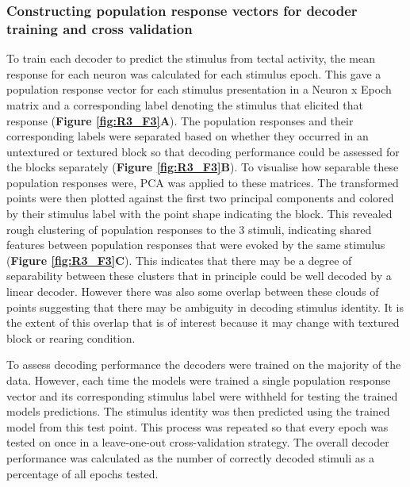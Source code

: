 \subsubsection{Constructing population response vectors for decoder training and cross validation}
To train each decoder to predict the stimulus from tectal activity, the mean response for each neuron was calculated for each stimulus epoch. This gave a population response vector for each stimulus presentation in a Neuron x Epoch matrix and a corresponding label denoting the stimulus that elicited that response (\textbf{Figure \ref{fig:R3_F3}A}). The population responses and their corresponding labels were separated based on whether they occurred in an untextured or textured block so that decoding performance could be assessed for the blocks separately (\textbf{Figure \ref{fig:R3_F3}B}). To visualise how separable these population responses were, PCA was applied to these matrices. The transformed points were then plotted against the first two principal components and colored by their stimulus label with the point shape indicating the block. This revealed rough clustering of population responses to the 3 stimuli, indicating shared features between population responses that were evoked by the same stimulus (\textbf{Figure \ref{fig:R3_F3}C}). This indicates that there may be a degree of separability between these clusters that in principle could be well decoded by a linear decoder. However there was also some overlap between these clouds of points suggesting that there may be ambiguity in decoding stimulus identity. It is the extent of this overlap that is of interest because it may change with textured block or rearing condition. 

To assess decoding performance the decoders were trained on the majority of the data. However, each time the models were trained a single population response vector and its corresponding stimulus label were withheld for testing the trained models predictions.  The stimulus identity was then predicted using the trained model from this test point. This process was repeated so that every epoch was tested on once in a leave-one-out cross-validation strategy. The overall decoder performance was calculated as the number of correctly decoded stimuli as a percentage of all epochs tested. 

